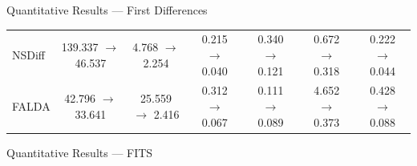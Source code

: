 \documentclass[aspectratio=169,11pt]{beamer}
\begin{document}
\begin{frame}{Quantitative Results — First Differences}
\begin{table}[ht]
{\begin{tabular}{l ccc ccc}
NSDiff        & \cellcolor{improved!40} 139.337 $\rightarrow$ 46.537 & \cellcolor{improved!40} 4.768 $\rightarrow$ 2.254 & \cellcolor{improved!40} 0.215 $\rightarrow$ 0.040 & \cellcolor{improved!40} 0.340 $\rightarrow$ 0.121 & \cellcolor{improved!40} 0.672 $\rightarrow$ 0.318 & \cellcolor{improved!40} 0.222 $\rightarrow$ 0.044 \\
FALDA         & \cellcolor{improved!40} 42.796 $\rightarrow$ 33.641 & \cellcolor{improved!40} 25.559 $\rightarrow$ 2.416 & \cellcolor{improved!40} 0.312 $\rightarrow$ 0.067 & \cellcolor{improved!40} 0.111 $\rightarrow$ 0.089 & \cellcolor{improved!40} 4.652 $\rightarrow$ 0.373 & \cellcolor{improved!40} 0.428 $\rightarrow$ 0.088 \\
\bottomrule
\end{tabular}
}
\end{table}
\end{frame}

\begin{frame}{Quantitative Results — FITS}
\begin{table}[ht]
\centering
\caption{...}
\label{tab:csdi_fd}
\end{table}
\end{frame}

\end{document}
